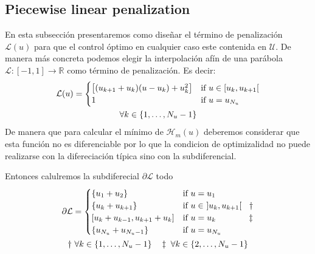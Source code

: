 \subsection{Piecewise linear penalization}

En esta subsección presentaremos como diseñar el término de penalización $\mathcal{L}(u)$ para que el control óptimo en cualquier caso este contenida en $\mathcal{U}$. 
%
De manera más concreta podemos elegir la interpolación afín de una parábola  $\mathcal{L}:[-1,1] \rightarrow \mathbb{R}$ como término de penalización. Es decir:  
\begin{gather}\label{PLP}
    {\mathcal{L}(u)} = \begin{cases}
        \big[ (u_{k+1}+u_{k}) (u-u_k) + u_k^2 \big] & \text{if}  u \in [u_k,u_{k+1}[ \\
        1 & \text{if} \ u = u_{N_u} 
    \end{cases} \\
    \notag \forall k \in \{1,\dots,N_u-1\}
\end{gather}
%
De manera que para calcular el mínimo de $\mathcal{H}_m(u)$ deberemos considerar que esta función no es diferenciable por lo que la condicion de optimizalidad no puede realizarse con la difereciación típica sino con la subdiferencial.

Entonces calulremos la subdiferecial $\partial \mathcal{L}$ todo 
\begin{gather}
        \partial\mathcal{L}= \begin{cases}
            \{u_1 + u_2  \}   & \text{if} \ u = u_1 \\
            \{u_k + u_{k+1}\}  & \text{if} \ u \in \ ]u_k,u_{k+1}[ \hspace{0.9em} \dagger\\
            [u_k+u_{k-1} ,  u_{k+1}+u_k] & \text{if} \ u = u_k \hspace{3.9em} \ddagger \\
            \{u_{N_u} + u_{N_u-1}  \} & \text{if} \ u = u_{N_u} 
       \end{cases} \\
       \notag \dagger \ \forall k \in \{1,\dots,N_u-1\} \hspace{1em}
       \notag \ddagger  \ \forall k \in \{2,\dots,N_u-1\}
\end{gather} 

